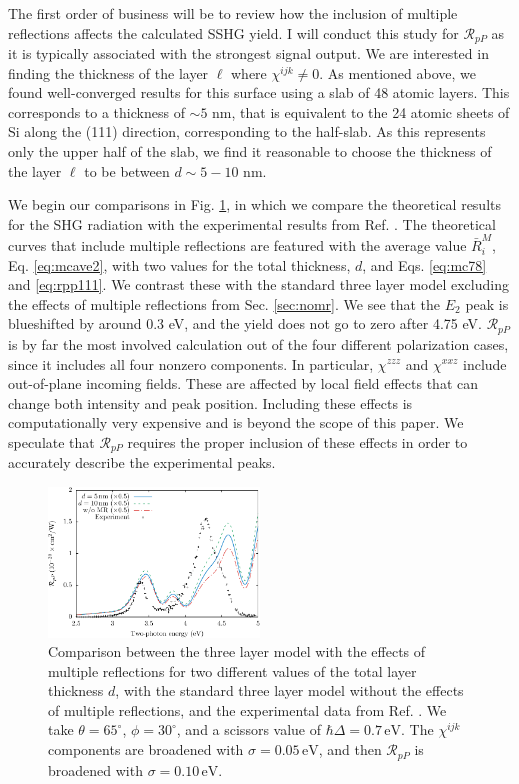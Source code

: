 The first order of business will be to review how the inclusion of multiple
reflections affects the calculated SSHG yield. I will conduct this study for
$\mathcal{R}_{pP}$ as it is typically associated with the strongest signal
output. We are interested in finding the thickness of the layer $\ell$ where
$\chi^{ijk} \ne 0$. As mentioned above, we found well-converged results for this
surface using a slab of 48 atomic layers. This corresponds to a thickness of
$\sim 5$ nm, that is equivalent to the 24 atomic sheets of Si along the (111)
direction, corresponding to the half-slab. As this represents only the upper
half of the slab, we find it reasonable to choose the thickness of the layer
$\ell$ to be between $d\sim 5-10$ nm.

We begin our comparisons in Fig. \ref{fig:average}, in which we compare the theoretical results for the SHG radiation with the experimental results from Ref. \cite{mejiaPRB02}. The theoretical curves that include multiple reflections are featured with the average value $\bar{R}^{M}_{i}$, Eq. \eqref{eq:mcave2}, with two values for the total thickness, $d$, and Eqs. \eqref{eq:mc78} and \eqref{eq:rpp111}. We contrast these with the standard three layer model excluding the effects of multiple reflections from Sec. \ref{sec:nomr}. We see that the $E_{2}$ peak is blueshifted by around 0.3 eV, and the yield does not go to zero after 4.75 eV. $\mathcal{R}_{pP}$ is by far the most involved calculation out of the four different polarization cases, since it includes all four nonzero components. In particular, $\chi^{zzz}$ and $\chi^{xxz}$ include out-of-plane incoming fields. These are affected by local field effects that can change both intensity and peak position.\cite{tancognedejean:tel-01235611} Including these effects is computationally very expensive and is beyond the scope of this paper. We speculate that $\mathcal{R}_{pP}$ requires the proper inclusion of these effects in order to accurately describe the experimental peaks.

\begin{figure}[H]
\centering
\includegraphics[width=0.5\textwidth]{content/figures/fig-Si1x1-MRthickness}
\caption{Comparison between the three layer model with the effects of multiple reflections for two different values of the total layer thickness $d$, with the standard three layer model without the effects of multiple reflections, and the experimental data from Ref. \cite{mejiaPRB02}. We take $\theta=65^{\circ}$, $\phi=30^{\circ}$, and a scissors value of $\hbar\Delta = 0.7\,\text{eV}$. The $\chi^{ijk}$ components are broadened with $\sigma=0.05\,\text{eV}$, and then $\mathcal{R}_{pP}$ is broadened with $\sigma=0.10\,\text{eV}$.}
\label{fig:average}
\end{figure}

